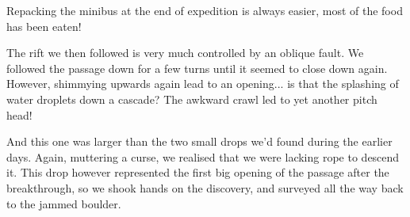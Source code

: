 \begin{marginfigure}
\label{packing the bus}
\caption{Repacking the minibus at the end of expedition is always easier, most of the food has been eaten!  }
\end{marginfigure}


The rift we then followed is very much controlled by an oblique fault. We followed the passage down for a few turns until it seemed to close down again. However, shimmying upwards again lead to an opening... is that the splashing of water droplets down a cascade? The awkward crawl led to yet another pitch head!

And this one was larger than the two small drops we'd found during the earlier days. Again, muttering a curse, we realised that we were lacking rope to descend it. This drop however represented the first big opening of the passage after the breakthrough, so we shook hands on the discovery, and surveyed all the way back to the jammed boulder.


